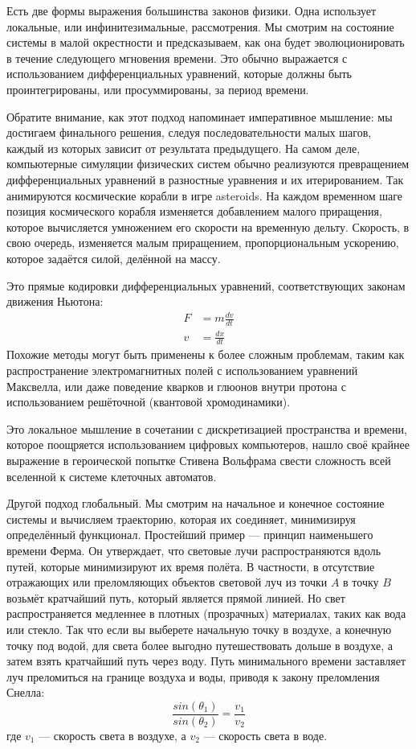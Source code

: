 Есть две формы выражения большинства законов физики. Одна использует локальные,
или инфинитезимальные, рассмотрения. Мы смотрим на состояние системы
в малой окрестности и предсказываем, как она будет эволюционировать в течение
следующего мгновения времени. Это обычно выражается с использованием дифференциальных
уравнений, которые должны быть проинтегрированы, или просуммированы, за период
времени.

Обратите внимание, как этот подход напоминает императивное мышление: мы достигаем
финального решения, следуя последовательности малых шагов, каждый из которых зависит от
результата предыдущего. На самом деле, компьютерные симуляции
физических систем обычно реализуются превращением дифференциальных
уравнений в разностные уравнения и их итерированием. Так
анимируются космические корабли в игре asteroids. На каждом временном шаге
позиция космического корабля изменяется добавлением малого приращения, которое
вычисляется умножением его скорости на временную дельту. Скорость,
в свою очередь, изменяется малым приращением, пропорциональным ускорению,
которое задаётся силой, делённой на массу.

Это прямые кодировки дифференциальных уравнений,
соответствующих законам движения Ньютона:
\begin{align*}
  F & = m \frac{dv}{dt} \\
  v & = \frac{dx}{dt}
\end{align*}
Похожие методы могут быть применены к более сложным проблемам, таким как
распространение электромагнитных полей с использованием уравнений Максвелла, или даже
поведение кварков и глюонов внутри протона с использованием решёточной 
(квантовой хромодинамики).

Это локальное мышление в сочетании с дискретизацией пространства и времени,
которое поощряется использованием цифровых компьютеров, нашло своё крайнее
выражение в героической попытке Стивена Вольфрама свести
сложность всей вселенной к системе клеточных автоматов.

Другой подход глобальный. Мы смотрим на начальное и конечное состояние
системы и вычисляем траекторию, которая их соединяет,
минимизируя определённый функционал. Простейший пример --- принцип
наименьшего времени Ферма. Он утверждает, что световые лучи распространяются вдоль путей,
которые минимизируют их время полёта. В частности, в отсутствие
отражающих или преломляющих объектов световой луч из точки $A$ в точку $B$
возьмёт кратчайший путь, который является прямой линией. Но свет
распространяется медленнее в плотных (прозрачных) материалах, таких как вода или стекло.
Так что если вы выберете начальную точку в воздухе, а конечную точку под
водой, для света более выгодно путешествовать дольше в воздухе, а
затем взять кратчайший путь через воду. Путь минимального времени заставляет
луч преломиться на границе воздуха и воды, приводя к закону преломления
Снелла:
\begin{equation*}
  \frac{sin(\theta_1)}{sin(\theta_2)} = \frac{v_1}{v_2}
\end{equation*}
где $v_1$ --- скорость света в воздухе, а $v_2$ ---
скорость света в воде.

